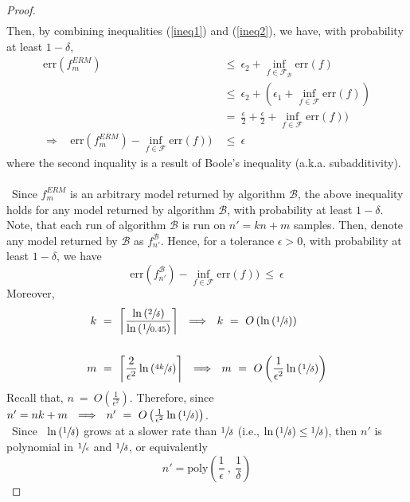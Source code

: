 \documentclass[twoside,11pt]{homework}
\DeclarePairedDelimiter{\2norm}{\lVert}{\rVert^2_2}
\newcommand{\1}[1]{\mathds{1}\left[#1\right]}
\begin{document}
\begin{proof}
\begin{align*}
\end{align*}
Then, by combining inequalities (\ref{ineq1}) and (\ref{ineq2}), we have, with probability at least $1 - \delta$,
\begin{align*}
\text{err}(f_m^{ERM})  \ &\leq \ \epsilon_2 + \inf_{f \in \mathcal{F_{\mathcal{B}}}}\text{err}(f)\\[0.5em]
& \leq \ \epsilon_2 + (\epsilon_1 + \inf_{f \in \mathcal{F}}\text{err}(f)) \\[0.5em]
& = \ \frac{\epsilon}{2} + \frac{\epsilon}{2} + \inf_{f \in \mathcal{F}}\text{err}(f)) \\[0.5em]
\Longrightarrow \ \ \ \ \text{err}(f_m^{ERM}) - \inf_{f \in \mathcal{F}}\text{err}(f)) \ &\leq \ \epsilon
\end{align*}
where the second inquality is a result of Boole's inequality (a.k.a. subadditivity).
\\\ \\\
Since $f_m^{ERM}$ is an arbitrary model returned by algorithm $\mathcal{B}$, the above inequality holds for any model returned by algorithm $\mathcal{B}$, with probability at least $1 - \delta$. Note, that each run of algorithm $\mathcal{B}$ is run on $n' = kn + m$ samples. Then, denote any model returned by $\mathcal{B}$ as $f_{n'}^{\mathcal{B}}$.  Hence, for a tolerance $\epsilon > 0$, with probability at least $1-\delta$, we have
$$\text{err}(f_{n'}^{\mathcal{B}}) - \inf_{f \in \mathcal{F}}\text{err}(f)) \ \leq \ \epsilon$$
Moreover, 
\begin{align*}
k \ &= \ \left\lceil\frac{\ln\left(\sfrac{2}{\delta}\right)}{\ln\left(\sfrac{1}{0.45}\right)}\right\rceil \ \ \Longrightarrow \ \ k \ = \ O\left(\ln\left(\sfrac{1}{\delta}\right)\right)\\[1.5em]
m \ &= \ \left\lceil\frac{2}{\epsilon^2}\ln\left(\sfrac{4k}{\delta}\right)\right\rceil \ \ \Longrightarrow \ \ m \ = \ O\left(\frac{1}{\epsilon^2}\ln\left(\sfrac{1}{\delta}\right)\right)
\end{align*}
Recall that, $n \ = \ O\left(\frac{1}{\epsilon^2}\right)$. Therefore, since \ $n' = nk + m \ \ \Longrightarrow \ \ n' \ = \ O\left(\frac{1}{\epsilon^2}\ln\left(\sfrac{1}{\delta}\right)\right)$.\\\
Since \ $\ln\left(\sfrac{1}{\delta}\right)$ grows at a slower rate than $\sfrac{1}{\delta}$ (i.e., $\ln\left(\sfrac{1}{\delta}\right) \leq \sfrac{1}{\delta}$), then $n'$ is polynomial in $\sfrac{1}{\epsilon}$ and $\sfrac{1}{\delta}$, or equivalently
$$n' = \text{poly}\left(\frac{1}{\epsilon} \ , \ \frac{1}{\delta}\right)$$


\end{proof}
\end{document}
